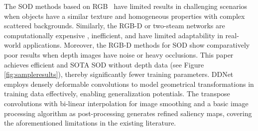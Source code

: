 \documentclass{article}
\begin{document}
The SOD methods based on RGB~\cite{deng2018r3net} have limited results in challenging scenarios when objects have a similar texture and homogeneous properties with complex scattered backgrounds. Similarly, the RGB-D or two-steam networks are computationally expensive \cite{zhang2020uc}, inefficient, and have limited adaptability in real-world applications. Moreover, the RGB-D methods for SOD show comparatively poor results when depth images have noise or heavy occlusions. This paper achieves efficient and SOTA SOD without depth data (see Figure \ref{fig:sampleresults}), thereby significantly fewer training parameters. DDNet employs densely deformable convolutions to model geometrical transformations in training data effectively, enabling generalization potentials. The transpose convolutions with bi-linear interpolation for image smoothing and a basic image processing algorithm as post-processing generates refined saliency maps, covering the aforementioned limitations in the existing literature.
\end{document}
